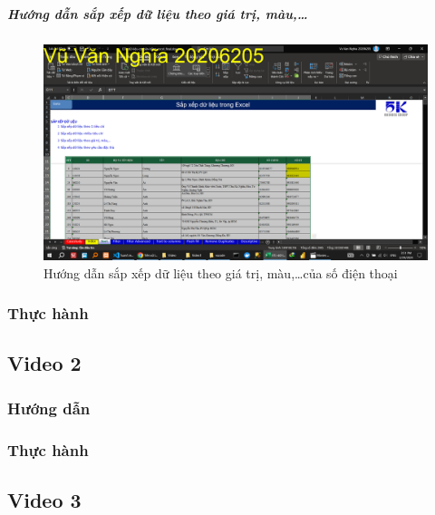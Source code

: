 \documentclass{article}
\begin{document}
\subparagraph{Hướng dẫn sắp xếp dữ liệu theo giá trị, màu,\dots}
\begin{figure}[h]
    \centering
    \includegraphics[scale = 0.15]{Video1/HuongDan/3.png}
    \caption{Hướng dẫn sắp xếp dữ liệu theo  giá trị, màu,\dots của số điện thoại}
\end{figure}












\subsubsection{Thực hành}



\subsection{Video 2}
\subsubsection{Hướng dẫn}

\subsubsection{Thực hành}




\subsection{Video 3}
\end{document}

